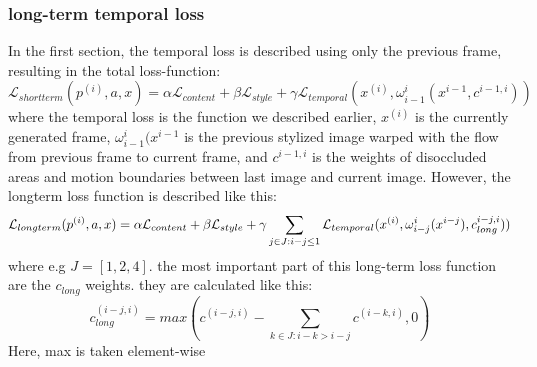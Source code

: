 \subsubsection{long-term temporal loss}
\label{sec:long_term_temporal_loss}
In the first section, the temporal loss is described using only the previous frame, resulting in the total loss-function: 
\begin{equation}
\mathcal{L}_{shortterm}(p^{(i)}, a, x) = \alpha \mathcal{L}_{content} + \beta \mathcal{L}_{style} + \gamma \mathcal{L}_{temporal}(x^{(i)}, \omega_{i-1}^i(x^{i-1}, c^{i-1, i}))
\end{equation}
where the temporal loss is the function we described earlier, $x^{(i)}$ is the currently generated frame,  $\omega_{i-1}^i(x^{i-1}$ is the previous stylized image warped with the flow from previous frame to current frame, and $c^{i-1, i}$ is the weights of disoccluded areas and motion boundaries between last image and current image. However, the longterm loss function is described like this: \newline
\begin{equation}
\mathcal{L}_{longterm}(p^{(i)}, a, x) = \alpha \mathcal{L}_{content} + \beta \\\mathcal{L}_{style} + \gamma \sum_{j\in J: i-j \leq 1}\mathcal{L}_{temporal}(x^{(i)}, \omega_{i-j}^i(x^{i-j}), c_{long}^{i-j, i}))
\end{equation}
where e.g $J = [1, 2, 4]$. the most important part of this long-term loss function are the $c_{long}$ weights. they are calculated like this:\newline
\begin{equation}
c_{long}^{(i-j, i)} = max(c^{(i-j, i)} - \sum_{k\in J: i - k > i - j} c^{(i-k, i)}, 0)
\end{equation}
Here, max is taken element-wise\newline
